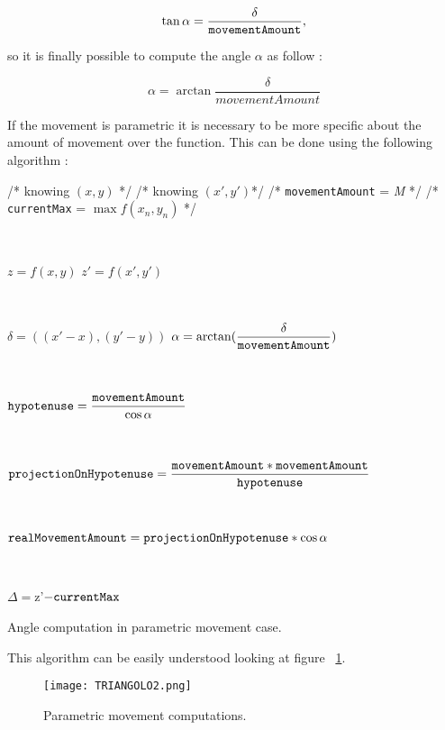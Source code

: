 \begin{equation}
	\tan \alpha = \dfrac{\delta}{\tt movementAmount},
\end{equation}

so it is finally possible to compute the angle $\alpha$ as follow :

\begin{equation}
	\alpha = \arctan \dfrac{\delta}{movementAmount}
\end{equation}

If the movement is parametric it is necessary to be more specific about the amount of movement over the function. This can be done using the following algorithm :

\begin{algorithm}
	/* knowing $(x, y)$ */ \;
	/* knowing $(x', y')$*/ \;
	/* {\tt movementAmount} = \textit{M} */ \;
	/* {\tt currentMax} = $\max f(x_n, y_n)$ */ \;
	
	
	\
	
	$z = f(x, y)$ \;
	$z' = f(x', y')$\;
	
	\
	
	$\delta = ((x'-x),  (y'-y))$ \;
	$\alpha = \arctan(\dfrac{\delta}{\tt movementAmount})$ \;
	
	\
	
	${\tt hypotenuse} = \dfrac{{\tt movementAmount}}{\cos \alpha}$ \;
	
	\
	
	${\tt projectionOnHypotenuse} = \dfrac{{\tt movementAmount} * {\tt movementAmount}}{{\tt hypotenuse}}$ \;
	
	\
	
	${\tt realMovementAmount} = {\tt projectionOnHypotenuse} * \cos \alpha$ \;
	 
	 \
	
	$\Delta = $z'$ - {\tt currentMax} $\;
	
	\caption{Angle computation in parametric movement case.} 
	\label{PMAlgo}
	
\end{algorithm}

This algorithm can be easily understood looking at figure ~\ref{fig:PMComputations}. 

\begin{figure} [h!]
	\centering
	\texttt{[image: TRIANGOLO2.png]}
	\caption{Parametric movement computations.}
	\label{fig:PMComputations}
\end{figure}

